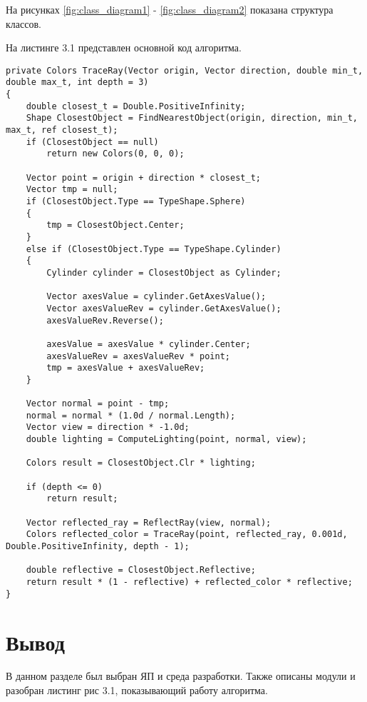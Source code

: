 На рисунках \ref{fig:class_diagram1} - \ref{fig:class_diagram2} показана структура классов.

\begin{figure}[ht!]
\end{figure}

\begin{figure}[ht!]
\end{figure}

\newpage

На листинге 3.1 представлен основной код алгоритма.


\begin{lstlisting}[label=some-code,caption=Трассировка лучей.]
private Colors TraceRay(Vector origin, Vector direction, double min_t, double max_t, int depth = 3)
{
	double closest_t = Double.PositiveInfinity;
	Shape ClosestObject = FindNearestObject(origin, direction, min_t, max_t, ref closest_t);
	if (ClosestObject == null)
		return new Colors(0, 0, 0);

	Vector point = origin + direction * closest_t;
	Vector tmp = null;
	if (ClosestObject.Type == TypeShape.Sphere)
	{
		tmp = ClosestObject.Center;
	}
	else if (ClosestObject.Type == TypeShape.Cylinder)
	{
		Cylinder cylinder = ClosestObject as Cylinder;

		Vector axesValue = cylinder.GetAxesValue();   
		Vector axesValueRev = cylinder.GetAxesValue(); 		
		axesValueRev.Reverse();

		axesValue = axesValue * cylinder.Center; 
		axesValueRev = axesValueRev * point;
		tmp = axesValue + axesValueRev; 
	}

	Vector normal = point - tmp;
	normal = normal * (1.0d / normal.Length);
	Vector view = direction * -1.0d;
	double lighting = ComputeLighting(point, normal, view);

	Colors result = ClosestObject.Clr * lighting;

	if (depth <= 0)
		return result;

	Vector reflected_ray = ReflectRay(view, normal);
	Colors reflected_color = TraceRay(point, reflected_ray, 0.001d, Double.PositiveInfinity, depth - 1);

	double reflective = ClosestObject.Reflective;
	return result * (1 - reflective) + reflected_color * reflective;
}
\end{lstlisting}

\section{Вывод}

В данном разделе был выбран ЯП и среда разработки.
Также описаны модули и разобран листинг рис 3.1, показывающий работу алгоритма.